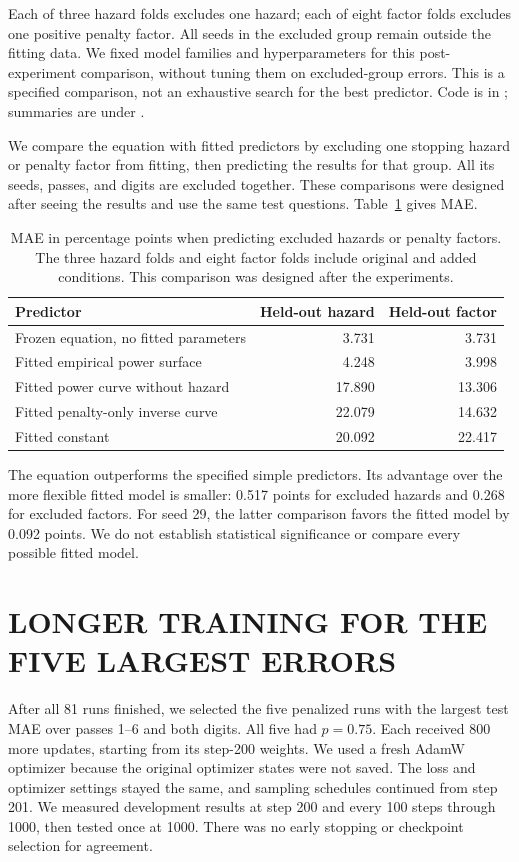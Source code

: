 Each of three hazard folds excludes one hazard; each of eight factor folds excludes one positive penalty factor. All seeds in the excluded group remain outside the fitting data. We fixed model families and hyperparameters for this post-experiment comparison, without tuning them on excluded-group errors. This is a specified comparison, not an exhaustive search for the best predictor. Code is in ; summaries are under .

We compare the equation with fitted predictors by excluding one stopping hazard or penalty factor from fitting, then predicting the results for that group. All its seeds, passes, and digits are excluded together. These comparisons were designed after seeing the results and use the same test questions. Table~\ref{tab:baselines} gives MAE.
\begin{table}[t]
\caption{MAE in percentage points when predicting excluded hazards or penalty factors. The three hazard folds and eight factor folds include original and added conditions. This comparison was designed after the experiments.}
\label{tab:baselines}
\centering\small
\begin{tabular}{lrr}
\toprule Predictor & Held-out hazard & Held-out factor\\\midrule
Frozen equation, no fitted parameters &3.731&3.731\\
Fitted empirical power surface &4.248&3.998\\
Fitted power curve without hazard &17.890&13.306\\
Fitted penalty-only inverse curve &22.079&14.632\\
Fitted constant &20.092&22.417\\\bottomrule
\end{tabular}
\end{table}
The equation outperforms the specified simple predictors. Its advantage over the more flexible fitted model is smaller: 0.517 points for excluded hazards and 0.268 for excluded factors. For seed 29, the latter comparison favors the fitted model by 0.092 points. We do not establish statistical significance or compare every possible fitted model.

\section{LONGER TRAINING FOR THE FIVE LARGEST ERRORS}\label{app:followup}
After all 81 runs finished, we selected the five penalized runs with the largest test MAE over passes 1--6 and both digits. All five had $p=0.75$. Each received 800 more updates, starting from its step-200 weights. We used a fresh AdamW optimizer because the original optimizer states were not saved. The loss and optimizer settings stayed the same, and sampling schedules continued from step 201. We measured development results at step 200 and every 100 steps through 1000, then tested once at 1000. There was no early stopping or checkpoint selection for agreement.

